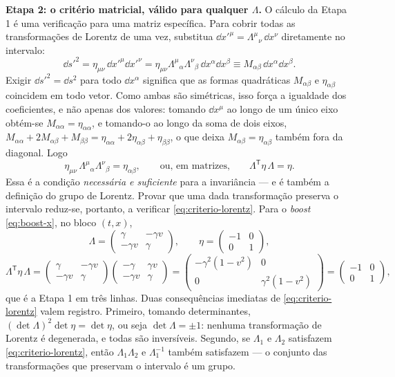 \documentclass[12pt,a4paper,oneside]{book}
\theoremstyle{rgplain}
\theoremstyle{rgremark}
\begin{document}
\textbf{Etapa 2: o critério matricial, válido para qualquer $\Lambda$.} O
cálculo da Etapa 1 é uma verificação para uma matriz específica. Para cobrir
todas as transformações de Lorentz de uma vez, substitua
$\dd x'^\mu=\Lambda^\mu{}_\nu\,\dd x^\nu$ diretamente no intervalo:
\[
  \dd s'^2=\eta_{\mu\nu}\,\dd x'^\mu\dd x'^\nu
         =\eta_{\mu\nu}\Lambda^\mu{}_\alpha\Lambda^\nu{}_\beta\,
          \dd x^\alpha\dd x^\beta
         \equiv M_{\alpha\beta}\,\dd x^\alpha\dd x^\beta .
\]
Exigir $\dd s'^2=\dd s^2$ para todo $\dd x^\alpha$ significa que as formas
quadráticas $M_{\alpha\beta}$ e $\eta_{\alpha\beta}$ coincidem em todo vetor.
Como ambas são simétricas, isso força a igualdade dos coeficientes, e não
apenas dos valores: tomando $\dd x^\mu$ ao longo de um único eixo obtém-se
$M_{\alpha\alpha}=\eta_{\alpha\alpha}$, e tomando-o ao longo da soma de dois
eixos, $M_{\alpha\alpha}+2M_{\alpha\beta}+M_{\beta\beta}
=\eta_{\alpha\alpha}+2\eta_{\alpha\beta}+\eta_{\beta\beta}$, o que deixa
$M_{\alpha\beta}=\eta_{\alpha\beta}$ também fora da diagonal. Logo
\begin{equation}
  \eta_{\mu\nu}\,\Lambda^\mu{}_\alpha\Lambda^\nu{}_\beta=\eta_{\alpha\beta},
  \qquad\text{ou, em matrizes,}\qquad
  \Lambda^{\mathsf T}\eta\,\Lambda=\eta .
  \label{eq:criterio-lorentz}
\end{equation}
Essa é a condição \emph{necessária e suficiente} para a invariância --- e é
também a definição do grupo de Lorentz. Provar que uma dada transformação
preserva o intervalo reduz-se, portanto, a verificar
\eqref{eq:criterio-lorentz}. Para o \emph{boost} \eqref{eq:boost-x}, no bloco
$(t,x)$,
\[
  \Lambda=\begin{pmatrix}\gamma & -\gamma v\\ -\gamma v & \gamma\end{pmatrix},
  \qquad
  \eta=\begin{pmatrix}-1 & 0\\ 0 & 1\end{pmatrix},
\]
\[
  \Lambda^{\mathsf T}\eta\,\Lambda
  =\begin{pmatrix}\gamma & -\gamma v\\ -\gamma v & \gamma\end{pmatrix}
   \begin{pmatrix}-\gamma & \gamma v\\ -\gamma v & \gamma\end{pmatrix}
  =\begin{pmatrix}-\gamma^2(1-v^2) & 0\\ 0 & \gamma^2(1-v^2)\end{pmatrix}
  =\begin{pmatrix}-1 & 0\\ 0 & 1\end{pmatrix},
\]
que é a Etapa 1 em três linhas. Duas consequências imediatas de
\eqref{eq:criterio-lorentz} valem registro. Primeiro, tomando determinantes,
$(\det\Lambda)^2\det\eta=\det\eta$, ou seja $\det\Lambda=\pm1$: nenhuma
transformação de Lorentz é degenerada, e todas são inversíveis. Segundo, se
$\Lambda_1$ e $\Lambda_2$ satisfazem \eqref{eq:criterio-lorentz}, então
$\Lambda_1\Lambda_2$ e $\Lambda_1^{-1}$ também satisfazem --- o conjunto das
transformações que preservam o intervalo é um grupo.
\end{document}
